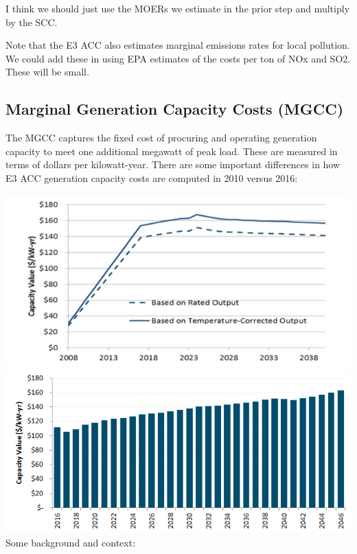 \documentclass[11pt]{article}
\begin{document}
\bigskip
 
I think we should just use the MOERs we estimate in the prior step and multiply by the SCC. 

\bigskip
 
Note that the E3 ACC also estimates marginal emissions rates for local pollution. We could add these in using EPA estimates of the costs per ton of NOx and SO2. These will be small.  


\subsection{Marginal Generation Capacity Costs (MGCC)}

The MGCC captures the fixed cost of procuring and operating generation capacity to meet one additional megawatt of peak load. These are measured in terms of  dollars per kilowatt-year.  There are some important differences in how E3 ACC generation capacity costs are computed in 2010 versus 2016:

\includegraphics[scale=1]{MGC_11.png}\\


\includegraphics[scale=1]{MGC16.png}\\

Some background and context:
\end{document}
